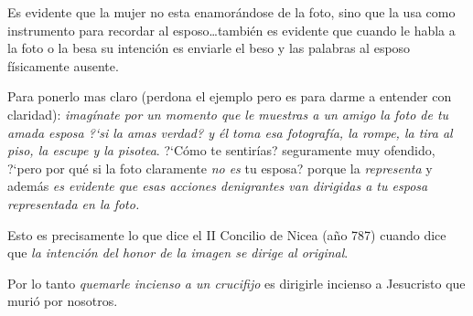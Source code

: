 \documentclass{article}
\begin{document}
\noindent
Es evidente que la mujer no esta enamor\'andose de la foto, sino que la usa como instrumento para recordar al esposo\ldots tambi\'en es evidente que cuando le habla a la foto o la besa su intenci\'on es enviarle el beso y las palabras al esposo f\'{i}sicamente ausente.

Para ponerlo mas claro (perdona el ejemplo pero es para darme a entender con claridad): \emph{imag\'{i}nate por un momento que le muestras a un amigo la foto de tu amada esposa ?`si la amas verdad? y \'el toma esa fotograf\'{i}a, la rompe, la tira al piso, la escupe y la pisotea}. ?`C\'omo te sentir\'{i}as? seguramente muy ofendido, ?`pero por qu\'e si la foto claramente \emph{no es} tu esposa? porque la \emph{representa} y adem\'as \emph{es evidente que esas acciones denigrantes van dirigidas a tu esposa representada en la foto.}

Esto es precisamente lo que dice el II Concilio de Nicea (a\~no 787) cuando dice que \emph{la intenci\'on del honor de la imagen se dirige al original}.

Por lo tanto \emph{quemarle incienso a un crucifijo} es dirigirle incienso a Jesucristo que muri\'o por nosotros.





\end{document}
